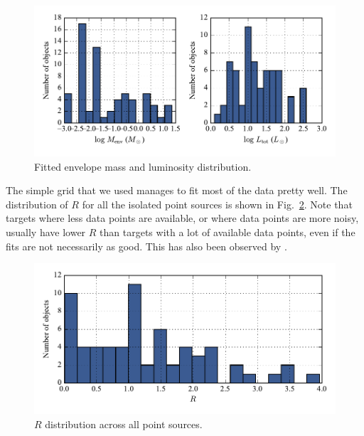 \begin{figure}[!h]
\begin{center}
\includegraphics[width=\textwidth]{Figures/MassLumHist.pdf}
\vspace{-1cm}
\caption[Fitted envelope mass and luminosity distribution]{Fitted envelope mass and luminosity distribution.}
\label{fig:MassLumHist}
\end{center}
\end{figure}

The simple grid that we used manages to fit most of the data pretty well. The distribution of $R$ for all the isolated point sources is shown in Fig.~\ref{fig:Rdistr}. Note that targets where less data points are available, or where data points are more noisy, usually have lower $R$ than targets with a lot of available data points, even if the fits are not necessarily as good. This has also been observed by \citep{Furlan:2016df}.

\begin{figure}[!h]
\begin{center}
\includegraphics[width=\textwidth]{Figures/Rdistr.pdf}
\vspace{-1cm}
\caption[Distribution of $R$]{$R$ distribution across all point sources.}
\label{fig:Rdistr}
\end{center}
\end{figure}



